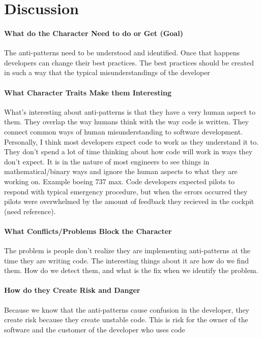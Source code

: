 \documentclass[conference]{IEEEtran}
\begin{document}
\section{Discussion}

\paragraph{What do the Character Need to do or Get (Goal)}
The anti-patterns need to be understood and identified.
Once that happens developers can change their best practices.
The best practices should be created in such a way that the typical misunderstandings of the developer


\paragraph{What Character Traits Make them Interesting}
What's interesting about anti-patterns is that they have a very human aspect to them. 
They overlap the way humans think with the way code is written. 
They connect common ways of human misunderstanding to software development. 
Personally, I think most developers expect code to work as they understand it to. 
They don't spend a lot of time thinking about how code will work in ways they don't expect.
It is in the nature of most engineers to see things in mathematical/binary ways and ignore the human aspects to what they are working on.
Example boeing 737 max.
Code developers expected pilots to respond with typical emergency procedure, but when the errors occurred they pilots were overwhelmed by the amount of feedback they recieved in the cockpit (need reference).
\paragraph{What Conflicts/Problems Block the Character}

The problem is people don't realize they are implementing anti-patterns at the time they are writing code.
The interesting things about it are how do we find them. 
How do we detect them, and what is the fix when we identify the problem.

\paragraph{How do they Create Risk and Danger}
Because we know that the anti-patterns cause confusion in the developer, they create risk because they create unstable code. 
This is risk for the owner of the software and the customer of the developer who uses code
\end{document}
